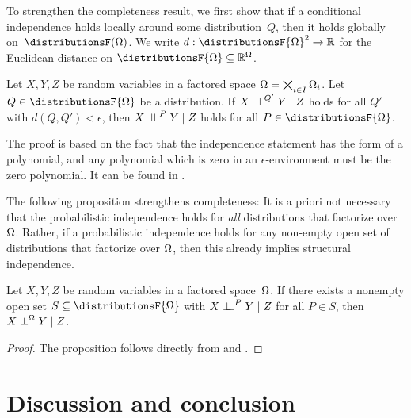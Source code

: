 \documentclass[USenglish,onecolumn]{article}
\begin{document}
To strengthen the completeness result, we first show that if a conditional independence holds locally around some distribution~$Q$, then it holds globally on~$\distributionsF(\Omg)$.
We write $d:\distributionsF{\factors}^2\to \mathbb{R}$ for the Euclidean distance on $\distributionsF{\factors} \subseteq \mathbb{R}^{\Omega}$.

\begin{lemma}
    \label{lemma:openset}
    Let $X,Y,Z$ be random variables in a factored space $\Omega=\bigtimes_{i\in I}\Omega_i$.
    Let $Q\in \distributionsF{\factors}$ be a distribution.
    If $X \mathrel{\perp\!\!\!\perp}^{Q'} Y \mid Z$ holds for all $Q'$ with $d(Q,Q')<\epsilon$, then $X \mathrel{\perp\!\!\!\perp}^{P} Y \mid Z$ holds for all  $P\in \distributionsF{\Omg}$.
\end{lemma}

  The proof is based on the fact that the independence statement has the form of a polynomial, and any polynomial which is zero in an $\epsilon$-environment must be the zero polynomial. It can be found in .

The following proposition strengthens completeness:
It is a priori not necessary that the probabilistic independence holds for \emph{all} distributions that factorize over $\Omega$. Rather, if a probabilistic independence holds for any non-empty open set of distributions that factorize over $\Omega$, then this already implies structural independence.

\begin{proposition}
    \label{prop:strongcomplete}
      Let $X,Y,Z$ be random variables in a factored space~$\Omega$. If there exists a nonempty open set $S\subseteq \distributionsF{\factors}$ with $X \mathrel{\perp\!\!\!\perp}^{P} Y \mid Z$ for all $P\in S$, then $X \mathrel{\perp}^\Omega Y \mid Z$.
\end{proposition}

\begin{proof}
  The proposition follows directly from   and .
\end{proof}



\section{Discussion and conclusion}
\label{sec:discussion}
\end{document}
